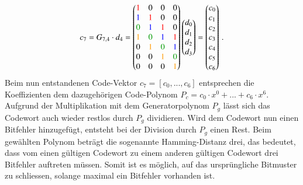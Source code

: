 \[
    c_7=G_{7,4} \cdot d_4=
    \begin{pmatrix}
              \textcolor{red}{1} &                       0  &                       0  &                       0  \\
             \textcolor{blue}{1} &       \textcolor{red}{1} &                       0  &                       0  \\
        \textcolor{darkgreen}{0} &      \textcolor{blue}{1} &       \textcolor{red}{1} &                       0  \\
           \textcolor{orange}{1} & \textcolor{darkgreen}{0} &      \textcolor{blue}{1} &       \textcolor{red}{1} \\
                              0  &    \textcolor{orange}{1} & \textcolor{darkgreen}{0} &      \textcolor{blue}{1} \\
                              0  &                       0  &    \textcolor{orange}{1} & \textcolor{darkgreen}{0} \\
                              0  &                       0  &                       0  &    \textcolor{orange}{1} 
    \end{pmatrix}
    \begin{pmatrix}
        d_0\\        
        d_1\\
        d_2\\
        d_3
    \end{pmatrix}
    =
    \begin{pmatrix}
        c_0\\        
        c_1\\
        c_2\\
        c_3\\
        c_4\\
        c_5\\
        c_6\\
    \end{pmatrix}\,.
\]
Beim nun entstandenen Code-Vektor $c_7=[c_0, ..., c_6]$ entsprechen die Koeffizienten dem dazugehörigen Code-Polynom $P_c=c_0\cdot x^0+...+c_6\cdot x^6$.
Aufgrund der Multiplikation mit dem Generatorpolynom $P_g$ lässt sich das Codewort auch wieder restlos durch $P_g$ dividieren.
Wird dem Codewort nun einen Bitfehler hinzugefügt, entsteht bei der Division durch $P_g$ einen Rest.
Beim gewählten Polynom beträgt die sogenannte Hamming-Distanz drei, das bedeutet,
dass vom einen gültigen Codewort zu einem anderen gültigen Codewort drei Bitfehler auftreten müssen.
Somit ist es möglich, auf das ursprüngliche Bitmuster zu schliessen, solange maximal ein Bitfehler vorhanden ist.
